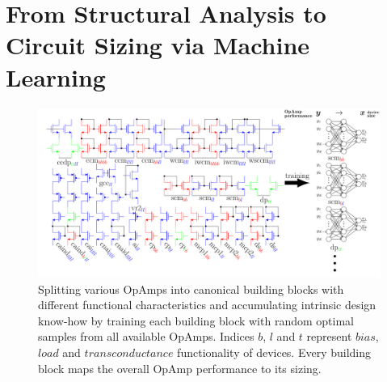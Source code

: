 \documentclass[conference]{IEEEtran}
\begin{document}
	 
	 	
 	\section{From Structural Analysis to Circuit Sizing via Machine Learning}\label{sec:intro2}
	\begin{figure}[h]
		\centering
        \includegraphics[width=\linewidth]{figures/struct_overview_incl_partition}
		\setlength{\abovecaptionskip}{0ex}%
		\setlength{\belowcaptionskip}{-2ex}%
		\caption{Splitting various OpAmps into canonical building blocks with different functional characteristics and accumulating intrinsic design know-how by training each building block with random optimal samples from all available OpAmps. Indices {\color{red} $b$}, {\color{blue} $l$} and {\color{green} $t$} represent {\color{red}$bias$}, {\color{blue}$load$} and {\color{green}$transconductance$} functionality of devices. Every building block maps the overall OpAmp performance to its sizing.}
		\label{fig:overview-structure}
	\end{figure}
	\setlength{\abovecaptionskip}{1ex}%
	\setlength{\belowcaptionskip}{-3ex}%
\end{document}
